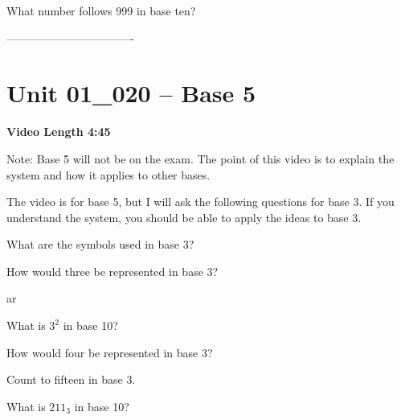 \documentclass[letterpaper,12pt]{exam}
\newcommand{\unit}{Unit 01}
\begin{document}
\begin{questions}
\begin{samepage}
    \question What number follows 999 in base ten?
    \vspace{5mm}
\end{samepage}
\par
 
----------------------------------

\section*{\unit\_020 -- Base 5}
\par{\selectfont\textbf{Video Length 4:45}}

Note:  Base 5 will not be on the exam.  The point of this video is to explain the system and how it applies to other bases.

The video is for base 5, but I will ask the following questions for base 3.  If you understand the system, you should be able to apply the ideas to base 3.

\begin{samepage}
    \question What are the symbols used in base 3?
    \vspace{5mm}
\end{samepage}
\begin{samepage}
    \question How would three be represented in base 3?
    \vspace{5mm}
\end{samepage}
ar

\begin{samepage}
    \question What is $3^2$ in base 10?
    \vspace{5mm}
\end{samepage}
\par

\begin{samepage}
    \question How would four be represented in base 3?
    \vspace{5mm}
\end{samepage}

\begin{samepage}
    \question Count to fifteen in base 3.
    \vspace{25mm}
\end{samepage}
\par
 
\begin{samepage}
    \question What is $211_3$ in base 10?
    \vspace{5mm}
\end{samepage}
\par


\end{questions}
\end{document}
